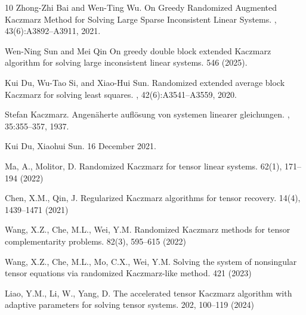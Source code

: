 \documentclass[11pt]{article}
\begin{document}
{\begin{thebibliography}{10}
Zhong-Zhi Bai and Wen-Ting Wu.
\newblock On {G}reedy {R}andomized {A}ugmented {K}aczmarz {M}ethod for
  {S}olving {L}arge {S}parse {I}nconsistent {L}inear {S}ystems.
, 43(6):A3892--A3911, 2021.

Wen-Ning Sun and Mei Qin
\newblock On greedy double block extended Kaczmarz algorithm for solving
large inconsistent linear systems.
 546 (2025).


Kui Du, Wu-Tao Si, and Xiao-Hui Sun.
\newblock Randomized extended average block {K}aczmarz for solving least
  squares.
, 42(6):A3541--A3559, 2020.


Stefan Kaczmarz.
\newblock Angen\"aherte aufl\"osung von systemen linearer gleichungen.
, 35:355--357, 1937.

Kui Du, Xiaohui Sun.
 16 December 2021.

Ma, A., Molitor, D.
\newblock Randomized Kaczmarz for tensor linear systems. 
 62(1), 171–194 (2022)

Chen, X.M., Qin, J.
\newblock Regularized Kaczmarz algorithms for tensor recovery.
 14(4), 1439–1471 (2021)

Wang, X.Z., Che, M.L., Wei, Y.M.
\newblock Randomized Kaczmarz methods for tensor complementarity problems.  82(3), 595–615 (2022)

Wang, X.Z., Che, M.L., Mo, C.X., Wei, Y.M.
Solving the system of nonsingular tensor equations via
randomized Kaczmarz-like method. 
 421 (2023)

Liao, Y.M., Li, W., Yang, D.
\newblock The accelerated tensor Kaczmarz algorithm with adaptive parameters for solving tensor systems. 
 202, 100–119 (2024)


\end{thebibliography}}
\end{document}

